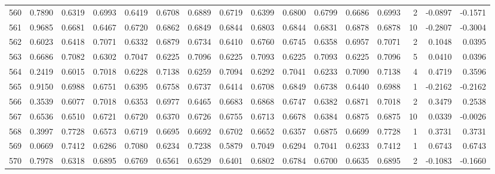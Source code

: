 \begin{tabular}{lrrrrrrrrrrrrrrr}
560 &      0.7890 &  0.6319 &  0.6993 &  0.6419 &  0.6708 &  0.6889 &  0.6719 &  0.6399 &  0.6800 &  0.6799 &   0.6686 &     0.6993 &      2 &                   -0.0897 &                    -0.1571 \\
561 &      0.9685 &  0.6681 &  0.6467 &  0.6720 &  0.6862 &  0.6849 &  0.6844 &  0.6803 &  0.6844 &  0.6831 &   0.6878 &     0.6878 &     10 &                   -0.2807 &                    -0.3004 \\
562 &      0.6023 &  0.6418 &  0.7071 &  0.6332 &  0.6879 &  0.6734 &  0.6410 &  0.6760 &  0.6745 &  0.6358 &   0.6957 &     0.7071 &      2 &                    0.1048 &                     0.0395 \\
563 &      0.6686 &  0.7082 &  0.6302 &  0.7047 &  0.6225 &  0.7096 &  0.6225 &  0.7093 &  0.6225 &  0.7093 &   0.6225 &     0.7096 &      5 &                    0.0410 &                     0.0396 \\
564 &      0.2419 &  0.6015 &  0.7018 &  0.6228 &  0.7138 &  0.6259 &  0.7094 &  0.6292 &  0.7041 &  0.6233 &   0.7090 &     0.7138 &      4 &                    0.4719 &                     0.3596 \\
565 &      0.9150 &  0.6988 &  0.6751 &  0.6395 &  0.6758 &  0.6737 &  0.6414 &  0.6708 &  0.6849 &  0.6738 &   0.6440 &     0.6988 &      1 &                   -0.2162 &                    -0.2162 \\
566 &      0.3539 &  0.6077 &  0.7018 &  0.6353 &  0.6977 &  0.6465 &  0.6683 &  0.6868 &  0.6747 &  0.6382 &   0.6871 &     0.7018 &      2 &                    0.3479 &                     0.2538 \\
567 &      0.6536 &  0.6510 &  0.6721 &  0.6720 &  0.6370 &  0.6726 &  0.6755 &  0.6713 &  0.6678 &  0.6384 &   0.6875 &     0.6875 &     10 &                    0.0339 &                    -0.0026 \\
568 &      0.3997 &  0.7728 &  0.6573 &  0.6719 &  0.6695 &  0.6692 &  0.6702 &  0.6652 &  0.6357 &  0.6875 &   0.6699 &     0.7728 &      1 &                    0.3731 &                     0.3731 \\
569 &      0.0669 &  0.7412 &  0.6286 &  0.7080 &  0.6234 &  0.7238 &  0.5879 &  0.7049 &  0.6294 &  0.7041 &   0.6233 &     0.7412 &      1 &                    0.6743 &                     0.6743 \\
570 &      0.7978 &  0.6318 &  0.6895 &  0.6769 &  0.6561 &  0.6529 &  0.6401 &  0.6802 &  0.6784 &  0.6700 &   0.6635 &     0.6895 &      2 &                   -0.1083 &                    -0.1660 \\

\end{tabular}
